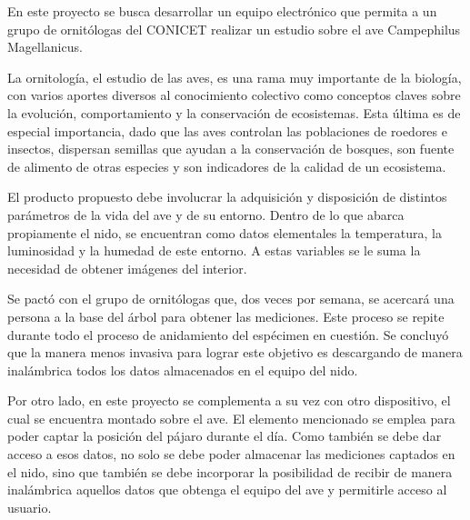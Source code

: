 En este proyecto se busca desarrollar un equipo electrónico que permita a un grupo de ornitólogas del CONICET realizar un estudio sobre el ave Campephilus Magellanicus.

La ornitología, el estudio de las aves, es una rama muy importante de la biología, con varios aportes diversos al conocimiento colectivo como conceptos claves sobre la evolución, comportamiento y la conservación de ecosistemas. Esta última es de especial importancia, dado que las aves controlan las poblaciones de roedores e insectos, dispersan semillas que ayudan a la conservación de bosques, son fuente de alimento de otras especies y son indicadores de la calidad de un ecosistema.

El producto propuesto debe involucrar la adquisición y disposición de distintos parámetros de la vida del ave y de su entorno. Dentro de lo que abarca propiamente el nido, se encuentran como datos elementales la temperatura, la luminosidad y la humedad de este entorno. A estas variables se le suma la necesidad de obtener imágenes del interior.

Se pactó con el grupo de ornitólogas que, dos veces por semana, se acercará una persona a la base del árbol para obtener las mediciones. Este proceso se repite durante todo el proceso de anidamiento del espécimen en cuestión. Se concluyó que la manera menos invasiva para lograr este objetivo es descargando de manera inalámbrica todos los datos almacenados en el equipo del nido. 

Por otro lado, en este proyecto se complementa a su vez con otro dispositivo, el cual se encuentra montado sobre el ave. El elemento mencionado se emplea para poder captar la posición del pájaro durante el día. Como también se debe dar acceso a esos datos, no solo se debe poder almacenar las mediciones captados en el nido, sino que también se debe incorporar la posibilidad de recibir de manera inalámbrica aquellos datos que obtenga el equipo del ave y permitirle acceso al usuario. 